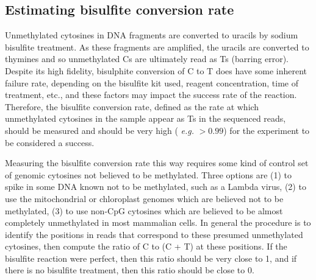 \documentclass[10pt]{article}
\begin{document}



\subsection{Estimating bisulfite conversion rate}
\label{sec:estim-busilf-conv}

Unmethylated cytosines in DNA fragments are converted to uracils by
sodium bisulfite treatment. As these fragments are amplified, the
uracils are converted to thymines and so unmethylated Cs are
ultimately read as Ts (barring error). Despite its high fidelity,
bisulphite conversion of C to T does have some inherent failure rate,
depending on the bisulfite kit used, reagent concentration, time of
treatment, etc., and these factors may impact the success rate of the
reaction. Therefore, the bisulfite conversion rate, defined as the
rate at which unmethylated cytosines in the sample appear as Ts in the
sequenced reads, should be measured and should be very high ({\em
  e.g.} $>0.99$) for the experiment to be considered a success.

Measuring the bisulfite conversion rate this way requires some kind of
control set of genomic cytosines not believed to be methylated. Three
options are (1) to spike in some DNA known not to be methylated, such
as a Lambda virus, (2) to use the mitochondrial or chloroplast genomes
which are believed not to be methylated, (3) to use non-CpG cytosines
which are believed to be almost completely unmethylated in most
mammalian cells. In general the procedure is to identify the positions
in reads that correspond to these presumed unmethylated cytosines,
then compute the ratio of C to (C + T) at these positions. If the
bisulfite reaction were perfect, then this ratio should be very close
to 1, and if there is no bisulfite treatment, then this ratio should
be close to 0.
\end{document}
